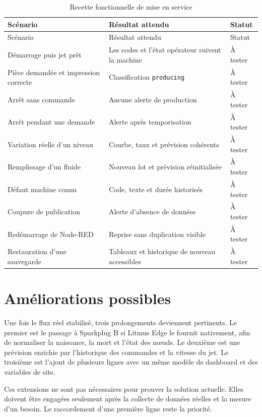 \begin{longtable}{p{}p{}p{}}
\caption{Recette fonctionnelle de mise en service}\\
\toprule
Scénario & Résultat attendu & Statut \\
\midrule
\endfirsthead
\toprule
Scénario & Résultat attendu & Statut \\
\midrule
\endhead
Démarrage puis jet prêt & Les codes et l'état opérateur suivent la machine & À tester \\
Pièce demandée et impression correcte & Classification \texttt{producing} & À tester \\
Arrêt sans commande & Aucune alerte de production & À tester \\
Arrêt pendant une demande & Alerte après temporisation & À tester \\
Variation réelle d'un niveau & Courbe, taux et prévision cohérents & À tester \\
Remplissage d'un fluide & Nouveau lot et prévision réinitialisée & À tester \\
Défaut machine connu & Code, texte et durée historisés & À tester \\
Coupure de publication & Alerte d'absence de données & À tester \\
Redémarrage de Node-RED & Reprise sans duplication visible & À tester \\
Restauration d'une sauvegarde & Tableaux et historique de nouveau accessibles & À tester \\
\bottomrule
\end{longtable}

\section{Améliorations possibles}

Une fois le flux réel stabilisé, trois prolongements deviennent pertinents.
Le premier est le passage à Sparkplug B si Litmus Edge le fournit nativement,
afin de normaliser la naissance, la mort et l'état des nœuds. Le deuxième est
une prévision enrichie par l'historique des commandes et la vitesse du jet. Le
troisième est l'ajout de plusieurs lignes avec un même modèle de dashboard et
des variables de site.

Ces extensions ne sont pas nécessaires pour prouver la solution actuelle.
Elles doivent être engagées seulement après la collecte de données réelles et
la mesure d'un besoin. Le raccordement d'une première ligne reste la priorité.
